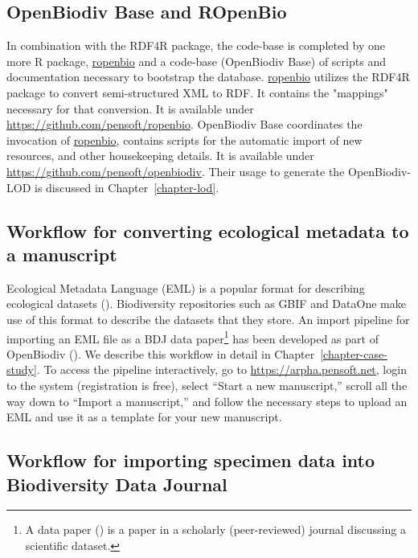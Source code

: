 \subsection{OpenBiodiv Base and ROpenBio}

In combination with the RDF4R package, the code-base is completed by one more R package, \url{ropenbio} and a code-base (OpenBiodiv Base) of scripts and documentation necessary to bootstrap the database. \url{ropenbio} utilizes the RDF4R package to convert semi-structured XML to RDF. It contains the "mappings" necessary for that conversion. It is available under \url{https://github.com/pensoft/ropenbio}. OpenBiodiv Base coordinates the invocation of \url{ropenbio}, contains scripts for the automatic import of new resources, and other housekeeping details. It is available under \url{https://github.com/pensoft/openbiodiv}. Their usage to generate the OpenBiodiv-LOD is discussed in Chapter~\ref{chapter-lod}.

\subsection{Workflow for converting ecological metadata to a manuscript}  

Ecological Metadata Language (EML) is a popular format for describing ecological datasets (\cite{michener_nongeospatial_1997}). Biodiversity repositories such as GBIF and DataOne make use of this format to describe the datasets that they store. An import pipeline for importing an EML file as a BDJ data paper\footnote{A data paper (\cite{chavan_data_2011}) is a paper in a scholarly (peer-reviewed) journal discussing a scientific dataset.} has been developed as part of OpenBiodiv (\cite{senderov_online_2016}). We describe this workflow in detail in Chapter~\ref{chapter-case-study}. To access the pipeline interactively, go to \url{https://arpha.pensoft.net}, login to the system (registration is free), select ``Start a new manuscript,'' scroll all the way down to ``Import a manuscript,'' and follow the necessary steps to upload an EML and use it as a template for your new manuscript.

\subsection{Workflow for importing specimen data into Biodiversity Data Journal}

